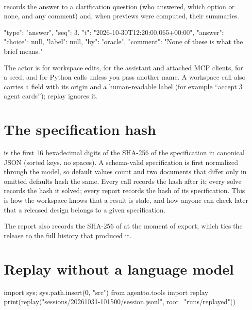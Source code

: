 \paragraph{} records the answer to a clarification question (who answered, which option or none, and any
comment) and, when previews were computed, their summaries.
\begin{jsoncode}
{"type": "answer", "seq": 3, "t": "2026-10-30T12:20:00.065+00:00",
 "answer": {"choice": null, "label": null, "by": "oracle",
            "comment": "None of these is what the brief means."}}
\end{jsoncode}

The actor is  for workspace edits,  for the assistant and attached MCP clients,  for
a seed, and  for Python calls unless you pass another name. A workspace call also carries a
 field with its origin and a human-readable label (for example ``accept 3 agent cards''); replay ignores it.

\section{The specification hash}\label{sec:hash}
 is the first 16 hexadecimal digits of the SHA-256 of the specification in canonical JSON (sorted keys,
no spaces). A schema-valid specification is first normalized through the model, so default values count and two
documents that differ only in omitted defaults hash the same. Every call records the hash after it; every solve records
the hash it solved; every report records the hash of its specification. This is how the workspace knows that a result
is stale, and how anyone can check later that a released design belongs to a given specification.

The report also records the SHA-256 of  at the moment of export, which ties the release to the full
history that produced it.

\section{Replay without a language model}\label{sec:replay}
\begin{pycode}
import sys; sys.path.insert(0, "src")
from agentto.tools import replay
print(replay("sessions/20261031-101500/session.jsonl", root="runs/replayed"))
\end{pycode}

